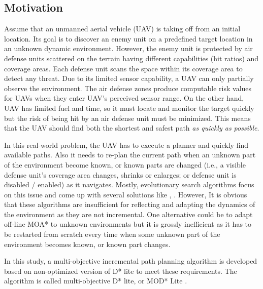 \documentclass[10pt,journal]{IEEEtran}
\begin{document}
\subsection{Motivation}
Assume that an unmanned aerial vehicle (UAV) is taking off from an initial location. Its goal is to discover an enemy unit on a predefined target location in an unknown dynamic environment. However, the enemy unit is protected by air defense units scattered on the terrain having different capabilities (hit ratios) and coverage areas. Each defense unit scans the space within its coverage area to detect any threat. Due to its limited sensor capability, a UAV can only partially observe the environment. The air defense zones produce computable risk values for UAVs when they enter UAV's perceived sensor range. On the other hand, UAV has limited fuel and time, so it must locate and monitor the target quickly but the risk of being hit by an air defense unit must be minimized. This means that the UAV should find both the shortest and safest path \textit{as quickly as possible}.

In this real-world problem, the UAV has to execute a planner and quickly find available paths. Also it needs to re-plan the current path when an unknown part of the environment become known, or known parts are changed (i.e., a visible defense unit's coverage area changes, shrinks or enlarges; or defense unit is disabled / enabled) as it navigates. Mostly, evolutionary search algorithms focus on this issue and come up with several solutions like \cite{Peng_Xu_Zhang:2011}, \cite{Foo_Knutzon:2009}. However, It is obvious that these algorithms are insufficient for reflecting and adapting the dynamics of the environment as they are not incremental. One alternative could be to adapt off-line MOA* to unknown environments but it is grossly inefficient as it has to be restarted from scratch every time when some unknown part of the environment becomes known, or known part changes.

In this study, a multi-objective incremental path planning algorithm is developed based on non-optimized version of D* lite \cite{Koenig:2002} to meet these requirements. The algorithm is called multi-objective D* lite, or MOD* Lite \cite{Oral:2012}.
\end{document}
